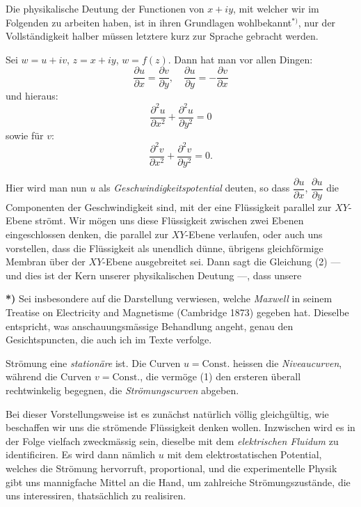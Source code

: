 \documentclass{article}
\begin{document}
Die physikalische Deutung der Functionen von $x + iy$, mit welcher wir im Folgenden zu arbeiten haben, ist in ihren Grundlagen wohlbekannt${}^{*)}$, nur der Vollständigkeit halber müssen letztere kurz zur Sprache gebracht werden.

Sei $w = u + iv$, $z = x + iy$, $w = f(z)$. Dann hat man vor allen Dingen:
\[ \frac{\partial u}{\partial x} = \frac{\partial v}{\partial y}, \quad \frac{\partial u}{\partial y} = -\frac{\partial v}{\partial x} \tag{1} \]
und hieraus:
\[ \frac{\partial^{2} u}{\partial x^{2}} + \frac{\partial^{2} u}{\partial y^{2}} = 0 \tag{2} \]
sowie für $v$:
\[ \frac{\partial^{2} v}{\partial x^{2}} + \frac{\partial^{2} v}{\partial y^{2}} = 0. \tag{3} \]

Hier wird man nun $u$ als \emph{Geschwindigkeitspotential} deuten, so dass $\dfrac{\partial u}{\partial x}$, $\dfrac{\partial u}{\partial y}$ die Componenten der Geschwindigkeit sind, mit der eine Flüssigkeit parallel zur $XY$-Ebene strömt. Wir mögen uns diese Flüssigkeit zwischen zwei Ebenen eingeschlossen denken, die parallel zur $XY$-Ebene verlaufen, oder auch uns vorstellen, dass die Flüssigkeit als unendlich dünne, übrigens gleichförmige Membran über der $XY$-Ebene ausgebreitet sei. Dann sagt die Gleichung (2) --- und dies ist der Kern unserer physikalischen Deutung ---, dass unsere

\textbf{*)} Sei insbesondere auf die Darstellung verwiesen, welche \emph{Maxwell} in seinem Treatise on Electricity and Magnetisme (Cambridge 1873) gegeben hat. Dieselbe entspricht, was anschauungsmässige Behandlung angeht, genau den Gesichtspuncten, die auch ich im Texte verfolge.

Strömung eine \emph{stationäre} ist. Die Curven $u = \text{Const.}$ heissen die \emph{Niveaucurven}, während die Curven $v = \text{Const.}$, die vermöge (1) den ersteren überall rechtwinkelig begegnen, die \emph{Strömungscurven} abgeben.

Bei dieser Vorstellungsweise ist es zunächst natürlich völlig gleichgültig, wie beschaffen wir uns die strömende Flüssigkeit denken wollen. Inzwischen wird es in der Folge vielfach zweckmässig sein, dieselbe mit dem \emph{elektrischen Fluidum} zu identificiren. Es wird dann nämlich $u$ mit dem elektrostatischen Potential, welches die Strömung hervorruft, proportional, und die experimentelle Physik gibt uns mannigfache Mittel an die Hand, um zahlreiche Strömungszustände, die uns interessiren, thatsächlich zu realisiren.
\end{document}
